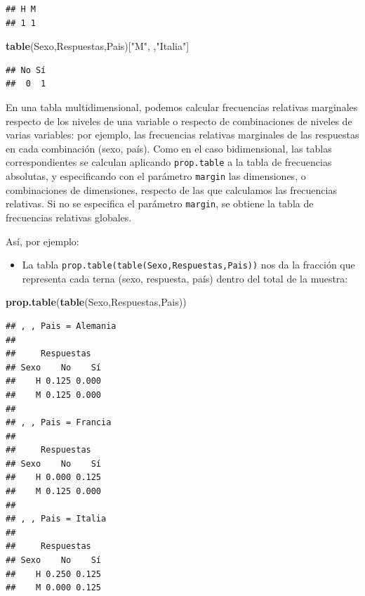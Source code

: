 \documentclass[]{book}
\newenvironment{Shaded}{\begin{snugshade}}{\end{snugshade}}
\newcommand{\KeywordTok}[1]{\textcolor[rgb]{0.13,0.29,0.53}{\textbf{#1}}}
\newcommand{\NormalTok}[1]{#1}
\newcommand{\StringTok}[1]{\textcolor[rgb]{0.31,0.60,0.02}{#1}}
\providecommand{\tightlist}{%
  \setlength{\itemsep}{0pt}\setlength{\parskip}{0pt}}
\theoremstyle{definition}
\theoremstyle{definition}
\theoremstyle{definition}
\theoremstyle{remark}
\begin{document}
\begin{verbatim}
## H M 
## 1 1
\end{verbatim}

\begin{Shaded}
\begin{Highlighting}[]
\KeywordTok{table}\NormalTok{(Sexo,Respuestas,Pais)[}\StringTok{"M"}\NormalTok{, ,}\StringTok{"Italia"}\NormalTok{]}
\end{Highlighting}
\end{Shaded}

\begin{verbatim}
## No Sí 
##  0  1
\end{verbatim}

En una tabla multidimensional, podemos calcular frecuencias relativas marginales respecto de los niveles de una variable o respecto de combinaciones de niveles de varias variables: por ejemplo, las frecuencias relativas marginales de las respuestas en cada combinación (sexo, país). Como en el caso bidimensional, las tablas correspondientes se calculan aplicando \texttt{prop.table} a la tabla de frecuencias absolutas, y especificando con el parámetro \texttt{margin} las dimensiones, o combinaciones de dimensiones, respecto de las que calculamos las frecuencias relativas. Si no se especifica el parámetro \texttt{margin}, se obtiene la tabla de frecuencias relativas globales.

Así, por ejemplo:

\begin{itemize}
\tightlist
\item
  La tabla \texttt{prop.table(table(Sexo,Respuestas,Pais))} nos da la fracción que representa cada terna (sexo, respuesta, país) dentro del total de la muestra:
\end{itemize}

\begin{Shaded}
\begin{Highlighting}[]
\KeywordTok{prop.table}\NormalTok{(}\KeywordTok{table}\NormalTok{(Sexo,Respuestas,Pais)) }
\end{Highlighting}
\end{Shaded}

\begin{verbatim}
## , , Pais = Alemania
## 
##     Respuestas
## Sexo    No    Sí
##    H 0.125 0.000
##    M 0.125 0.000
## 
## , , Pais = Francia
## 
##     Respuestas
## Sexo    No    Sí
##    H 0.000 0.125
##    M 0.125 0.000
## 
## , , Pais = Italia
## 
##     Respuestas
## Sexo    No    Sí
##    H 0.250 0.125
##    M 0.000 0.125
\end{verbatim}
\end{document}
